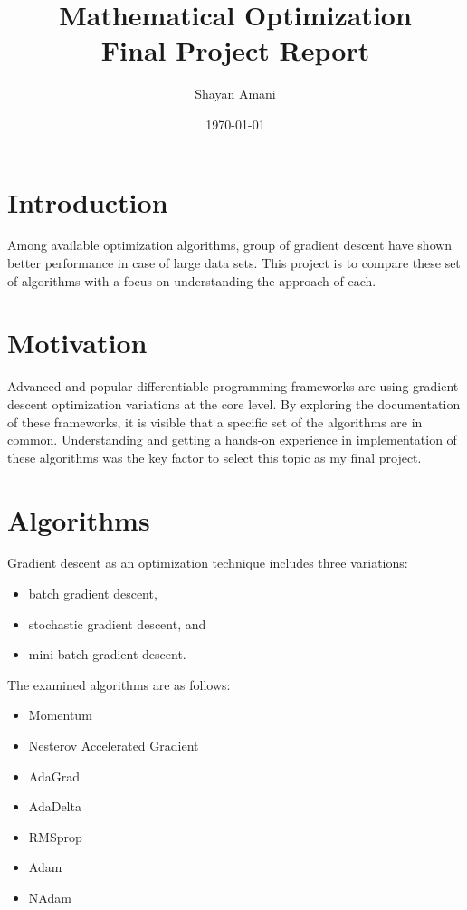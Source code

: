\documentclass[12pt]{article}
\title{Mathematical Optimization\\Final Project Report}
\author{Shayan Amani}
\date{\today}
\begin{document}
\maketitle

\section{Introduction}
Among available optimization algorithms, group of gradient descent have shown better performance in case of large data sets. This project is to compare these set of algorithms with a focus on understanding the approach of each.

\section{Motivation}
Advanced and popular differentiable programming frameworks are using gradient descent optimization variations at the core level. By exploring the documentation of these frameworks, it is visible that a specific set of the algorithms are in common. Understanding and getting a hands-on experience in implementation of these algorithms was the key factor to select this topic as my final project.

\section{Algorithms}
Gradient descent as an optimization technique includes three variations:
\begin{itemize}
    \item batch gradient descent,
    \item stochastic gradient descent, and 
    \item mini-batch gradient descent.
\end{itemize}
The examined algorithms are as follows:
\begin{itemize}
    \item Momentum \cite{NQianOnAlgorithms}
    \item Nesterov Accelerated Gradient \cite{NESTEROV1983AO1/k2}
    \item AdaGrad \cite{DuchiAdaptiveOptimization}
    \item AdaDelta \cite{Zeiler2012ADADELTA:Method}
    \item RMSprop \cite{HintonNeuralDescent}
    \item Adam \cite{KingmaAdam:Optimization}
    \item NAdam \cite{Dozat2016IncorporatingAdam}
\end{itemize}
\end{document}
